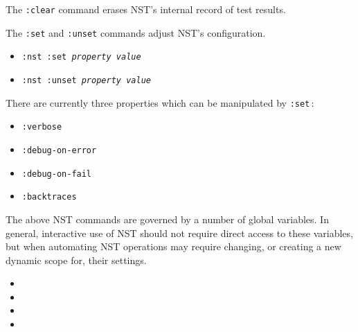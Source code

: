 The \texttt{:clear} command erases NST's internal record of test
results.

The \texttt{:set} and \texttt{:unset} commands adjust NST's
configuration.
\begin{itemize}
\item\texttt{:nst :set {\itshape property} {\itshape value}}
\item\texttt{:nst :unset {\itshape property} {\itshape value}}
\end{itemize}
There are currently three properties which can be manipulated by
\texttt{:set}\,:
\begin{itemize}
\item\texttt{:verbose}~~
  

\item\texttt{:debug-on-error}~~
  

\item\texttt{:debug-on-fail}~~
  

\item\texttt{:backtraces}~~
  
\end{itemize}

The above NST commands are governed by a number of global variables.
In general, interactive use of NST should not require direct access to
these variables, but when automating NST operations may require
changing, or creating a new dynamic scope for, their settings.
\begin{itemize}
\item

\item

\item

\item

\end{itemize}

